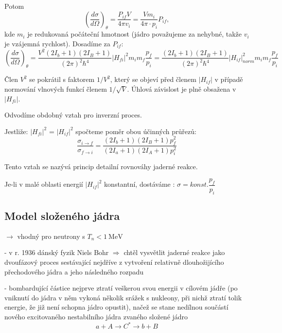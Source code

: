 \documentclass[../../main.tex]{subfiles}
\begin{document}
Potom 
\begin{equation}
\left( \dfrac{d \sigma}{d \Omega}\right)_{\theta} = \dfrac{P_{if} V}{4 \pi v_i} = \dfrac{V m_i}{4 \pi \cdotp p_i} P_{if}, 
\end{equation}
kde $m_i$ je redukovaná počáteční hmotnost (jádro považujeme za nehybné, takže $v_i$ je vzájemná rychlost). Dosadíme za $P_{if}$:
\begin{equation}
\left( \dfrac{d \sigma}{d \Omega}\right)_{\theta} = \dfrac{V^2 (2I_b + 1)(2 I_B +1)}{(2 \pi)^2 \hbar^4} |H_{fi}|^2 m_i m_f \dfrac{p_f}{p_i} = \dfrac{(2I_b + 1)(2I_B + 1)}{(2 \pi)^2 \hbar^4} |H_{if}|_{norm} ^{2} m_i m_f \dfrac{p_f}{p_i}  
\end{equation}	

Člen $V^2$ se pokrátil s faktorem $1/V^2$, který se objeví před členem $|H_{if}|$ v případě normování vlnových funkcí členem $1/\sqrt{V}$. Úhlová závislost je plně obsažena v $|H_{fi}|$.

Odvodíme obdobný vztah pro inverzní proces.

Jestliže: $|H_{fi}|^2$ = $|H_{if}|^2$ spočteme poměr obou účinných průřezů:
\begin{equation}
\dfrac{\sigma_{i\rightarrow f}}{\sigma _{f \rightarrow i}}  = \dfrac{(2I_b + 1)(2I_B + 1) p_{f}^{2}}{(2I_a +1)(2I_A + 1) p_{i}^{2}}
\end{equation}

Tento vztah se nazývá princip detailní rovnováhy jaderné reakce.

Je-li v malé oblasti energií $|H_{if}|^2$ konstantní, dostáváme : $\sigma = konst. \dfrac{p_f}{p_i}$	

\subsection{Model složeného jádra}

$\rightarrow$ vhodný pro neutrony s $T_n < 1 ~\mathrm{MeV}$

- v r. 1936 dánský fyzik Niels Bohr $\Rightarrow$ chtěl vysvětlit jaderné reakce jako dvoufázový proces sestávající nejdříve z vytvoření relativně dlouhožijícího přechodového jádra a jeho následného rozpadu

- bombardující částice nejprve ztratí veškerou svou energii v cílovém jádře (po vniknutí do jádra v něm vykoná několik srážek s nukleony, při nichž ztratí tolik energie, že již není schopna jádro opustit), načež se stane nedílnou součástí nového excitovaného nestabilního jádra zvaného složené jádro
\begin{equation}
a+A \rightarrow C^* \rightarrow b+B
\end{equation}
\end{document}
